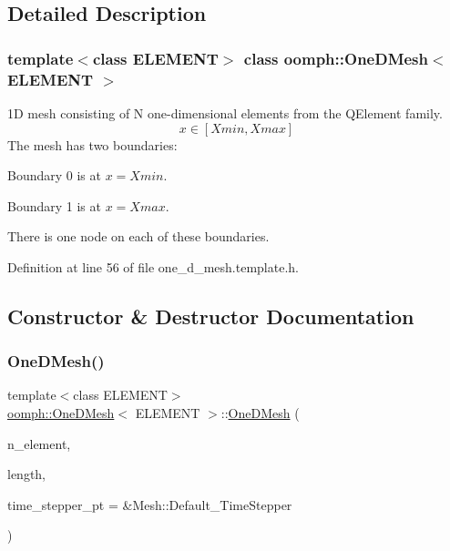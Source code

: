 \subsection{Detailed Description}
\subsubsection*{template$<$class E\+L\+E\+M\+E\+NT$>$\newline
class oomph\+::\+One\+D\+Mesh$<$ E\+L\+E\+M\+E\+N\+T $>$}

1D mesh consisting of N one-\/dimensional elements from the Q\+Element family. \[ x \in [Xmin,Xmax] \] The mesh has two boundaries\+:
\begin{DoxyItemize}
\item Boundary 0 is at $x=Xmin$.
\item Boundary 1 is at $x=Xmax$.
\end{DoxyItemize}There is one node on each of these boundaries. 

Definition at line 56 of file one\+\_\+d\+\_\+mesh.\+template.\+h.



\subsection{Constructor \& Destructor Documentation}
\mbox{\label{classoomph_1_1OneDMesh_ac6962f5c0184d302544253e3b4407c48}} 
\subsubsection{\texorpdfstring{One\+D\+Mesh()}{OneDMesh()}\hspace{0.1cm}{\footnotesize\ttfamily [1/2]}}
{\footnotesize\ttfamily template$<$class E\+L\+E\+M\+E\+NT$>$ \\
\hyperlink{classoomph_1_1OneDMesh}{oomph\+::\+One\+D\+Mesh}$<$ E\+L\+E\+M\+E\+NT $>$\+::\hyperlink{classoomph_1_1OneDMesh}{One\+D\+Mesh} (\begin{DoxyParamCaption}\item[{const unsigned \&}]{n\+\_\+element,  }\item[{const double \&}]{length,  }\item[{Time\+Stepper $\ast$}]{time\+\_\+stepper\+\_\+pt = {\ttfamily \&Mesh\+:\+:Default\+\_\+TimeStepper} }\end{DoxyParamCaption})\hspace{0.3cm}{\ttfamily [inline]}}




